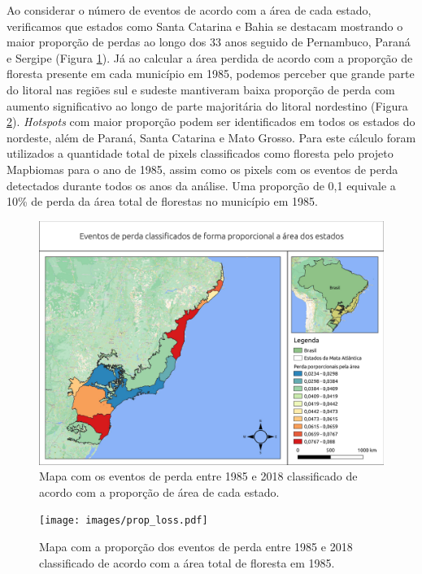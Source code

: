 Ao considerar o número de eventos de acordo com a área de cada estado, verificamos que estados como Santa Catarina e Bahia se destacam mostrando o maior proporção de perdas ao longo dos 33 anos seguido de Pernambuco, Paraná e Sergipe (Figura \ref{fig:estados_loss_proporcional}). Já ao calcular a área perdida de acordo com a proporção de floresta presente em cada município em 1985, podemos perceber que grande parte do litoral nas regiões sul e sudeste mantiveram baixa proporção de perda com aumento significativo ao longo de parte majoritária do litoral nordestino (Figura \ref{fig:prop_loss}). \textit{Hotspots} com maior proporção podem ser identificados em todos os estados do nordeste, além de Paraná, Santa Catarina e Mato Grosso. Para este cálculo foram utilizados a quantidade total de pixels classificados como floresta pelo projeto Mapbiomas para o ano de 1985, assim como os pixels com os eventos de perda detectados durante todos os anos da análise. Uma proporção de 0,1 equivale a 10\% de perda da área total de florestas no município em 1985.

\begin{figure}[H]
    \centering
    \includegraphics[scale=.5]{images/estado_loss_proporcional.pdf}
    \caption{Mapa com os eventos de perda entre 1985 e 2018 classificado de acordo com a proporção de área de cada estado.}
    \label{fig:estados_loss_proporcional}
\end{figure}

\begin{figure}[H]
    \centering
    \texttt{[image: images/prop\_loss.pdf]}
    \caption{Mapa com a proporção dos eventos de perda entre 1985 e 2018 classificado de acordo com a área total de floresta em 1985.}
    \label{fig:prop_loss}
\end{figure}

